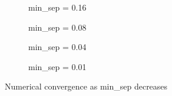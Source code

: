 \begin{figure}[htpb]
    \centering
    \begin{subfigure}[b]{0.475\textwidth}
        \centering
        \caption[]{{\small min\_sep = 0.16}}
        \label{fig:u0_dom_err_bs32}
    \end{subfigure}
    \begin{subfigure}[b]{0.475\textwidth}
        \centering
        \caption[]{{\small min\_sep = 0.08}}
        \label{fig:u0_dom_err_bs54}
    \end{subfigure}

    \begin{subfigure}[b]{0.475\textwidth}
        \centering
        \caption[]{{\small min\_sep = 0.04}}
        \label{fig:u0_dom_err_dp54}
    \end{subfigure}
    \begin{subfigure}[b]{0.475\textwidth}
        \centering
        \caption[]{{\small min\_sep = 0.01}}
        \label{fig:u0_dom_err_dp87}
    \end{subfigure}
    \caption[Veni, vidi, Aviici]{Numerical convergence as min\_sep decreases}
    \label{fig:u0_dom_errs}
\end{figure}

